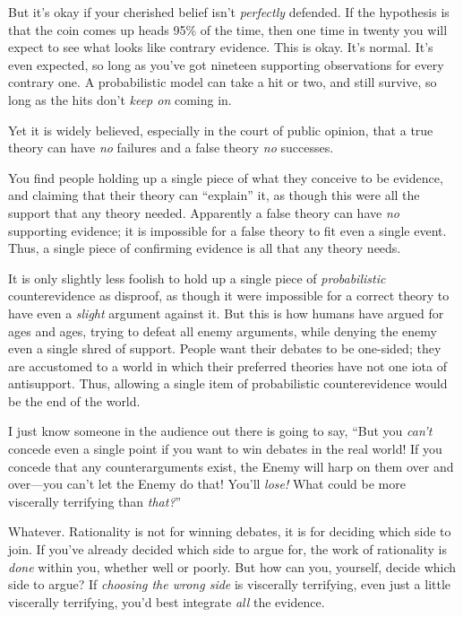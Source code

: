 {
 But it's okay if your cherished belief
isn't \textit{perfectly} defended. If the hypothesis is
that the coin comes up heads 95\% of the time, then one time in twenty
you will expect to see what looks like contrary evidence. This is okay.
It's normal. It's even expected, so
long as you've got nineteen supporting observations for
every contrary one. A probabilistic model can take a hit or two, and
still survive, so long as the hits don't \textit{keep
on} coming in.}

{
 Yet it is widely believed, especially in the court of public
opinion, that a true theory can have \textit{no} failures and a false
theory \textit{no} successes.}

{
 You find people holding up a single piece of what they conceive to
be evidence, and claiming that their theory can
``explain'' it, as though this were
all the support that any theory needed. Apparently a false theory can
have \textit{no} supporting evidence; it is impossible for a false
theory to fit even a single event. Thus, a single piece of confirming
evidence is all that any theory needs.}

{
 It is only slightly less foolish to hold up a single piece of
\textit{probabilistic} counterevidence as disproof, as though it were
impossible for a correct theory to have even a \textit{slight} argument
against it. But this is how humans have argued for ages and ages,
trying to defeat all enemy arguments, while denying the enemy even a
single shred of support. People want their debates to be one-sided;
they are accustomed to a world in which their preferred theories have
not one iota of antisupport. Thus, allowing a single item of
probabilistic counterevidence would be the end of the world.}

{
 I just know someone in the audience out there is going to say,
``But you \textit{can't} concede even
a single point if you want to win debates in the real world! If you
concede that any counterarguments exist, the Enemy will harp on them
over and over---you can't let the Enemy do that!
You'll \textit{lose!} What could be more viscerally
terrifying than \textit{that?}''}

{
 Whatever. Rationality is not for winning debates, it is for
deciding which side to join. If you've already decided
which side to argue for, the work of rationality is \textit{done}
within you, whether well or poorly. But how can you, yourself, decide
which side to argue? If \textit{choosing the wrong side} is viscerally
terrifying, even just a little viscerally terrifying,
you'd best integrate \textit{all} the evidence.}


